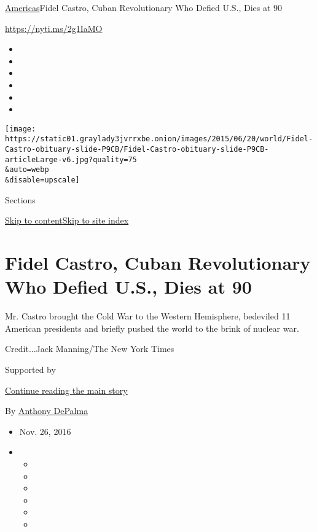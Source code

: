 \href{/section/world/americas}{Americas}\textbar{}Fidel Castro, Cuban
Revolutionary Who Defied U.S., Dies at 90

\href{https://nyti.ms/2g1IaMO}{https://nyti.ms/2g1IaMO}

\begin{itemize}
\item
\item
\item
\item
\item
\item
\end{itemize}

\texttt{[image: https://static01.graylady3jvrrxbe.onion/images/2015/06/20/world/Fidel-Castro-obituary-slide-P9CB/Fidel-Castro-obituary-slide-P9CB-articleLarge-v6.jpg?quality=75\\\&auto=webp\\\&disable=upscale]}

Sections

\protect\hyperlink{site-content}{Skip to
content}\protect\hyperlink{site-index}{Skip to site index}

\hypertarget{fidel-castro-cuban-revolutionary-who-defied-us-dies-at-90}{%
\section{Fidel Castro, Cuban Revolutionary Who Defied U.S., Dies at
90}\label{fidel-castro-cuban-revolutionary-who-defied-us-dies-at-90}}

Mr. Castro brought the Cold War to the Western Hemisphere, bedeviled 11
American presidents and briefly pushed the world to the brink of nuclear
war.

Credit...Jack Manning/The New York Times

Supported by

\protect\hyperlink{after-sponsor}{Continue reading the main story}

By \href{http://www.nytimes3xbfgragh.onion/by/anthony-depalma}{Anthony
DePalma}

\begin{itemize}
\item
  Nov. 26, 2016
\item
  \begin{itemize}
  \item
  \item
  \item
  \item
  \item
  \item
  \end{itemize}
\end{itemize}

